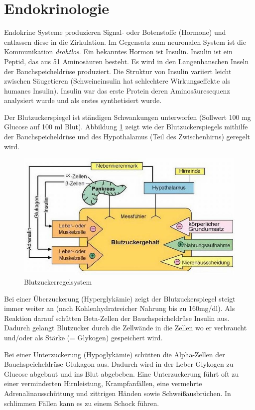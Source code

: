 \section{Endokrinologie}

Endokrine Systeme produzieren Signal- oder Botenstoffe (Hormone) und entlassen diese in die Zirkulation.  Im Gegensatz zum neuronalen System ist die Kommunikation \textit{drahtlos}. Ein bekanntes Hormon ist Insulin. Insulin ist ein Peptid, das aus 51 Aminosäuren besteht. Es wird in den Langenhanschen Inseln der Bauchspeicheldrüse produziert. Die Struktur von Insulin variiert leicht zwischen Säugetieren (Schweineinsulin hat schlechtere Wirkungseffekte als humanes Insulin). Insulin war das erste Protein deren Aminosäuresequenz analysiert wurde und als erstes synthetisiert wurde.

Der Blutzuckerspiegel ist ständigen Schwankungen unterworfen (Sollwert 100 mg Glucose auf 100 ml Blut). Abbildung \ref{fig:blutzucker} zeigt wie der Blutzuckerspiegels mithilfe der Bauchspeicheldrüse und des Hypothalamus (Teil des Zwischenhirns) geregelt wird.

\begin{figure}
\centering
\includegraphics[width=0.7\linewidth]{fig/blutzucker}
\caption{Blutzuckerregelsystem}
\label{fig:blutzucker}
\end{figure}

Bei einer Überzuckerung (Hyperglykämie) zeigt der Blutzuckerspiegel steigt immer weiter an (nach Kohlenhydratreicher Nahrung bis zu 160mg/dl). Als Reaktion darauf schütten Beta-Zellen der Bauchspeicheldrüse Insulin aus. Dadurch gelangt Blutzucker durch die Zellwände in die Zellen wo er verbraucht und/oder als Stärke (= Glykogen) gespeichert wird. 

Bei einer Unterzuckerung (Hypoglykämie) schütten die Alpha-Zellen der Bauchspeicheldrüse Glukagon aus. Dadurch wird in der Leber Glykogen zu Glucose abgebaut und ins Blut abgebeben. Eine Unterzuckerung führt oft zu einer verminderten Hirnleistung, Krampfanfällen, eine vermehrte Adrenalinausschüttung und zittrigen Händen sowie Schweißausbrüchen. In schlimmen Fällen kann es zu einem Schock führen.

